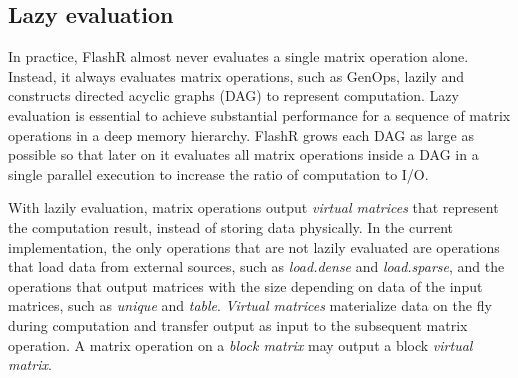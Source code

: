 


\subsection{Lazy evaluation}\label{sec:lazyeval}

In practice, FlashR almost never evaluates a single matrix operation alone.
Instead, it always evaluates matrix operations, such as GenOps,
lazily and constructs directed acyclic graphs (DAG) to represent computation.
Lazy evaluation is essential to achieve substantial performance for a sequence
of matrix operations in a deep memory hierarchy. FlashR grows each DAG as large
as possible so that later on it evaluates all matrix operations inside a DAG
in a single parallel execution to increase the ratio of computation to I/O.

With lazily evaluation, matrix operations
output \textit{virtual matrices} that represent the computation result,
instead of storing data physically. In the current implementation,
the only operations that are not lazily evaluated are operations that
load data from external sources, such as \textit{load.dense} and
\textit{load.sparse}, and the operations that output matrices
with the size depending on data of the input matrices, such as \textit{unique}
and \textit{table}.
\textit{Virtual matrices} materialize data on the fly during computation
and transfer output as input to the subsequent matrix operation.
A matrix operation on a \textit{block matrix} may output
a block \textit{virtual matrix}.


